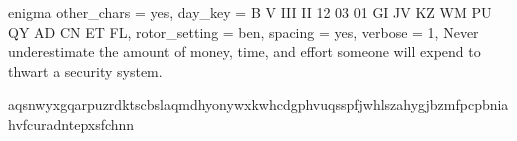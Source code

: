 \parindent0pt
 {enigma}
 {
    other_chars = yes,
        day_key = B V III II 12 03 01 GI JV KZ WM PU QY AD CN ET FL,
  rotor_setting = ben,
        spacing = yes,
        verbose = 1,
}
\beginencryption
  Never underestimate the amount of money, time, and effort someone
  will expend to thwart a security system.
\endencryption

\begindecryption
  aqsnwyxgqarpuzrdktscbslaqmdhyonywxkwhcdgphvuqsspfjwhlszahygjbzmfpcpbniahvfcuradntepxsfchnn
\enddecryption
\bye
